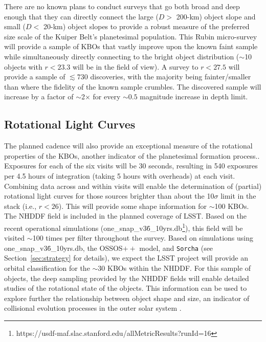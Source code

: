 \documentclass[modern,preprint]{aastex7}
\begin{document}
There are no known plans to conduct surveys that go both broad and deep enough that they can directly connect the large ($D>$ 200-km) object slope and small ($D<$ 20-km) object slopes to provide a robust measure of the preferred size scale of the Kuiper Belt's planetesimal population.
This Rubin micro-survey will provide a sample of KBOs that vastly improve upon the known faint sample while simultaneously directly connecting to the bright object distribution ($\sim$10 objects with $r<23.3$ will be in the field of view). A survey to $r<27.5$ will provide a sample of $\lesssim 730$ discoveries, with the majority being fainter/smaller than where the fidelity of the known sample crumbles. The discovered sample will increase by a factor of $\sim$2$\times$ for every $\sim0.5$ magnitude increase in depth limit. 

\subsection{Rotational Light Curves}
The planned cadence will also provide an exceptional measure of the rotational properties of the KBOs, another indicator of the planetesimal formation process..
Exposures for each of the six visits will be 30 seconds, resulting in 540 exposures per 4.5 hours of integration (taking 5 hours with overheads) at each visit.  
Combining data across and within visits will enable the determination of (partial) rotational light curves \citep[see][for example]{Strauss24} for those sources brighter than about the 10$\sigma$ limit in the stack (i.e., $r<26$).  
This will provide some shape information for $\sim$100 KBOs. 
The NHDDF field is included in the planned coverage of LSST. Based on the recent operational simulations (one\_snap\_v3\.6\_10yrs.db\footnote{https://usdf-maf.slac.stanford.edu/allMetricResults?runId=16}), this field will be visited $\sim$100 times per filter throughout the survey.  
Based on simulations using one\_snap\_v3\.6\_10yrs.db, the OSSOS$++$ model, and \texttt{Sorcha} (see Section~\ref{sec:strategy} for details), we expect the LSST project will provide an orbital classification for the $\sim30$ KBOs within the NHDDF.  
For this sample of objects, the deep sampling provided by the NHDDF fields will enable detailed studies of the rotational state of the objects. This information can be used to explore further the relationship between object shape and size, an indicator of collisional evolution processes in the outer solar system \citep{Benechhi13}.
\end{document}
